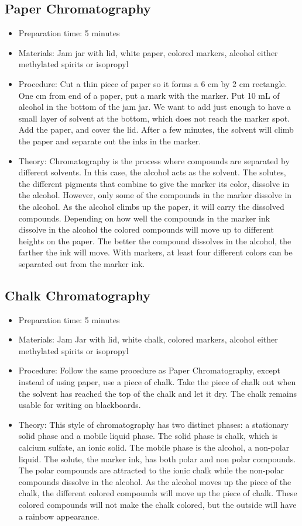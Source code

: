 \subsection{Paper Chromatography}
\begin{itemize}
\item{Preparation time: 5 minutes}
\item{Materials: Jam jar with lid, white paper, colored markers, alcohol either methylated spirits or isopropyl}
\item{Procedure: Cut a thin piece of paper so it forms a 6 cm by 2 cm rectangle. One cm from end of a paper, put a mark with the marker. Put 10 mL of alcohol in the bottom of the jam jar. We want to add just enough to have a small layer of solvent at the bottom, which does not reach the marker spot. Add the paper, and cover the lid. After a few minutes, the solvent will climb the paper and separate out the inks in the marker.}
\item{Theory: Chromatography is the process where compounds are separated by different solvents. In this case, the alcohol acts as the solvent. The solutes, the different pigments that combine to give the marker its color, dissolve in the alcohol. However, only some of the compounds in the marker dissolve in the alcohol. As the alcohol climbs up the paper, it will carry the dissolved compounds. Depending on how well the compounds in the marker ink dissolve in the alcohol the colored compounds will move up to different heights on the paper. The better the compound dissolves in the alcohol, the farther the ink will move. With markers, at least four different colors can be separated out from the marker ink. }
\end{itemize}

\subsection{Chalk Chromatography}
\begin{itemize}
\item{Preparation time:  5 minutes}
\item{Materials: Jam Jar with lid, white chalk, colored markers, alcohol either methylated spirits or isopropyl}
\item{Procedure: Follow the same procedure as Paper Chromatography, except instead of using paper, use a piece of chalk. Take the piece of chalk out when the solvent has reached the top of the chalk and let it dry. The chalk remains usable for writing on blackboards.}
\item{Theory: This style of chromatography has two distinct phases: a stationary solid phase and a mobile liquid phase. The solid phase is chalk, which is calcium sulfate, an ionic solid. The mobile phase is the alcohol, a non-polar liquid. The solute, the marker ink, has both polar and non polar compounds. The polar compounds are attracted to the ionic chalk while the non-polar compounds dissolve in the alcohol. As the alcohol moves up the piece of the chalk, the different colored compounds will move up the piece of chalk. These colored compounds will not make the chalk colored, but the outside will have a rainbow appearance.}
\end{itemize}

